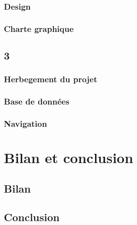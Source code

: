 \documentclass[french]{report}
\begin{document}
\subsection{Design}
\label{partie_design}

\subsection{Charte graphique}
\label{partie_charte_graphique}


\section{3\ieme{} \sprint{}}
\label{sprint3}
\subsection{Herbegement du projet}
\label{hebergement_du_projet}


\subsection{Base de données}
\label{base_de_donnees}


\subsection{Navigation}
\label{navigation}


\chapter{Bilan et conclusion}
\section{Bilan}
\label{partie_bilan}

\section{Conclusion}
\label{partie_conclusion}



\appendix 

\end{document}
